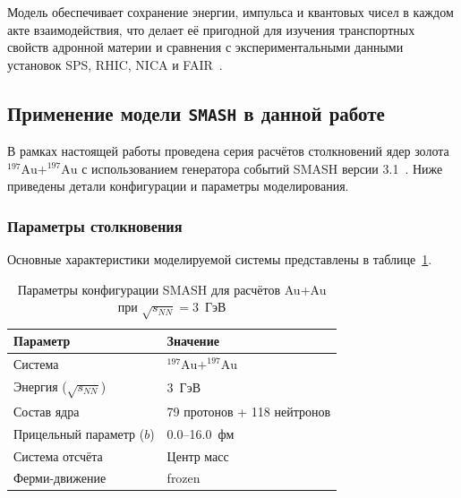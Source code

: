 \documentclass[a4paper]{extarticle}
\begin{document}
        Модель обеспечивает сохранение энергии, импульса и квантовых чисел в каждом акте взаимодействия, 
        что делает её пригодной для изучения транспортных свойств адронной материи и сравнения с 
        экспериментальными данными установок SPS, RHIC, NICA и FAIR~\cite{Weil:2016zrk}.


    \subsection{Применение модели \texttt{SMASH} в данной работе}
        В рамках настоящей работы проведена серия расчётов столкновений 
        ядер золота $^{197}\text{Au} + ^{197}\text{Au}$ 
        с использованием генератора событий SMASH версии 3.1~\cite{SMASH:Code}. 
        Ниже приведены детали конфигурации и параметры моделирования.

        \subsubsection{Параметры столкновения}
            Основные характеристики моделируемой системы 
            представлены в таблице~\ref{tab:smash_params}.

            \begin{table}[H]
                \centering
                \caption{
                    Параметры конфигурации SMASH 
                    для расчётов Au+Au при $\sqrt{s_{NN}} = 3$~ГэВ
                }
                \label{tab:smash_params}
                \begin{tabular}{|l|l|}
                    \hline
                    \textbf{Параметр} & \textbf{Значение} \\ \hline
                    Система & $^{197}\text{Au} + ^{197}\text{Au}$ \\ \hline
                    Энергия ($\sqrt{s_{NN}}$) & 3~ГэВ \\ \hline
                    Состав ядра & 79 протонов + 118 нейтронов \\ \hline
                    Прицельный параметр ($b$) & 0.0--16.0~фм \\ \hline
                    Система отсчёта & Центр масс \\ \hline
                    Ферми-движение & frozen \\ \hline
                \end{tabular}
            \end{table}
\end{document}
